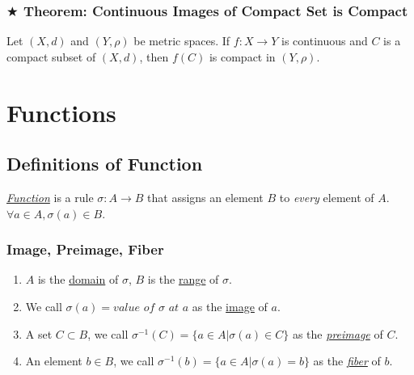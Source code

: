 \documentclass[11pt]{elegantbook}
\begin{document}
\subsection{$\bigstar$ Theorem: Continuous Images of Compact Set is Compact}
\begin{theorem}\label{con_compact_is_compact}
    Let $(X, d)$ and $(Y, \rho)$ be metric spaces. If $f : X \rightarrow Y$ is continuous and $C$ is a compact subset of $(X, d)$, then $f(C)$ is compact in $(Y, \rho)$.
\end{theorem}



\chapter{Functions}
\section{Definitions of Function}
\begin{definition}[Function]
    \normalfont
    \underline{\textit{Function}} is a rule $\sigma:A\rightarrow B$ that assigns an element $B$ to \textit{every} element of $A$. $\forall a\in A, \sigma(a)\in B$.
\end{definition}
\subsection{Image, Preimage, Fiber}
\begin{definition}
    \normalfont
\begin{enumerate}
    \item $A$ is the \underline{domain} of $\sigma$, $B$ is the \underline{range} of $\sigma$.
    \item We call $\sigma (a)= \textit{value of } \sigma\textit{ at } a$ as the \underline{image} of $a$.
    \item A set $C\subset B$, we call $\sigma^{-1}(C)=\{a\in A| \sigma(a)\in C\}$ as the \textit{\underline{preimage}} of $C$.
    \item An element $b\in B$, we call $\sigma^{-1}(b)=\{a\in A| \sigma(a)=b \}$ as the \textit{\underline{fiber}} of $b$.
\end{enumerate}
\end{definition}
\end{document}
